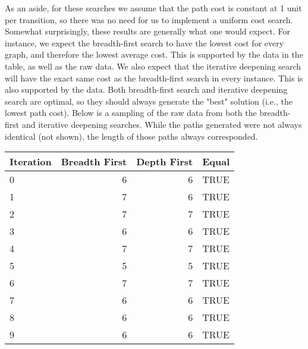 \documentclass[a4paper,11pt]{report}
\begin{document}
As an aside, for these searches we assume that the path cost is constant at 1
unit per transition, so there was no need for us to implement a uniform cost
search.  Somewhat surprisingly, these results are generally what one would
expect. For instance, we expect the breadth-first search to have the lowest
cost for every graph, and therefore the lowest average cost.  This is supported
by the data in the table, as well as the raw data. We also expect that the
iterative deepening search will have the exact same cost as the breadth-first
search in every instance.  This is also supported by the data.  Both
breadth-first search and iterative deepening search are optimal, so they should
always generate the "best" solution (i.e., the lowest path cost). Below is a
sampling of the raw data from both the breadth-first and iterative deepening
searches.  While the paths generated were not always identical (not shown), the
length of those paths always corresponded.\vspace{5 mm}

\begin{tabular}{ | l | r | r | l | }
  \hline
  Iteration & Breadth First & Depth First & Equal \\ \hline
  0 & 6 & 6 & TRUE \\
  1 & 7 & 6 & TRUE \\
  2 & 7 & 7 & TRUE \\
  3 & 6 & 6 & TRUE \\
  4 & 7 & 7 & TRUE \\
  5 & 5 & 5 & TRUE \\
  6 & 7 & 7 & TRUE \\
  7 & 6 & 6 & TRUE \\
  8 & 6 & 6 & TRUE \\
  9 & 6 & 6 & TRUE \\
  \hline
\end{tabular}
\vspace{5 mm}
\end{document}
